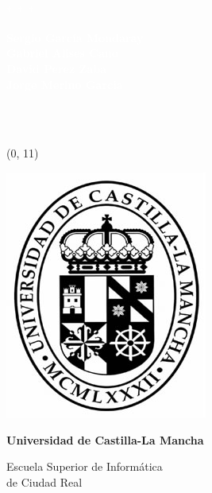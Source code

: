 \textbf{}\\[5cm]
\begin{adjustwidth*}{-140pt}{} %

  \begin{center}

    \begin{spacing}{1}
      \begin{Huge}\textbf{\textcolor{white}{\titulo}}\end{Huge}
    \end{spacing}
    \begin{Large}{\it \textbf{\textcolor{white}{\subtitulo}}}\end{Large}\\[0.2cm]
    \textcolor{white}{*\ *\ *}\\[0.2cm]
    \begin{large}\textcolor{white}{\bf Sergio García Mondaray\\Gabriel Alises Cano\\David Perez Zaba\\Jorge Merino Garcia}\end{large}\\

    \textbf{}\\[7cm]

  \end{center}
\end{adjustwidth*}


\begin{textblock}{16}(0, 11)
  \begin{center}
    \includegraphics[scale=0.5]{./img/uclm01.jpg}

    {\bf Universidad de Castilla-La Mancha}\par
    Escuela Superior de Informática\\de Ciudad Real
  \end{center}

\end{textblock}






